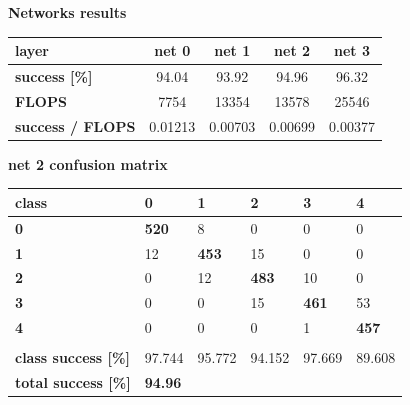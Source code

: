 \documentclass[xcolor=dvipsnames]{beamer}
\begin{document}
\begin{frame}{\bf Networks results}

{\footnotesize

    \begin{table}[]
    \begin{tabular}{|l|c|c|c|c|}
    \hline
    \textbf{layer}           & \textbf{net 0} & \textbf{net 1} & \textbf{net 2} & \textbf{net 3} \\ \hline
    \textbf{success [\%]}     & 94.04          & 93.92          & 94.96          & 96.32          \\ \hline
    \textbf{FLOPS}           & 7754           & 13354          & 13578          & 25546          \\ \hline
    \textbf{success / FLOPS} & 0.01213        & 0.00703        & 0.00699        & 0.00377        \\ \hline
    \end{tabular}
    \end{table}
}

{\large \bf net 2 confusion matrix}

{\footnotesize

\begin{table}[]
\begin{tabular}{|l|l|l|l|l|l|}
\hline
\textbf{class}         & \textbf{0}     & \textbf{1}   & \textbf{2}   & \textbf{3}   & \textbf{4}   \\ \hline
\textbf{0}             & \textbf{520}   & 8            & 0            & 0            & 0            \\ \hline
\textbf{1}             & 12             & \textbf{453} & 15           & 0            & 0            \\ \hline
\textbf{2}             & 0              & 12           & \textbf{483} & 10           & 0            \\ \hline
\textbf{3}             & 0              & 0            & 15           & \textbf{461} & 53           \\ \hline
\textbf{4}             & 0              & 0            & 0            & 1            & \textbf{457} \\ \hline
                       &                &              &              &              &              \\ \hline
\textbf{class success [\%]} & 97.744         & 95.772       & 94.152       & 97.669       & 89.608       \\ \hline
\textbf{total success [\%]} & \textbf{94.96} &              &              &              &              \\ \hline
\end{tabular}
\end{table}


}
\end{frame}
\end{document}

